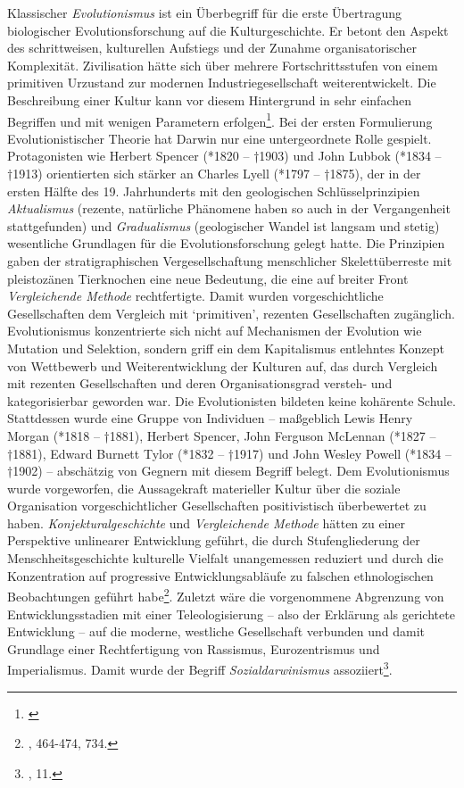 \documentclass[openany,twoside,twocolumn]{book}
\let\rmarkdownfootnote\footnote%
\def\footnote{\protect\rmarkdownfootnote}
\begin{document}
Klassischer \emph{Evolutionismus} ist ein Überbegriff für die erste
Übertragung biologischer Evolutionsforschung auf die Kulturgeschichte.
Er betont den Aspekt des schrittweisen, kulturellen Aufstiegs und der
Zunahme organisatorischer Komplexität. Zivilisation hätte sich über
mehrere Fortschrittsstufen von einem primitiven Urzustand zur modernen
Industriegesellschaft weiterentwickelt. Die Beschreibung einer Kultur
kann vor diesem Hintergrund in sehr einfachen Begriffen und mit wenigen
Parametern erfolgen\footnote{\textcite{noauthor_evolutionismus_1986}}.
Bei der ersten Formulierung Evolutionistischer Theorie hat Darwin nur
eine untergeordnete Rolle gespielt. Protagonisten wie Herbert Spencer
(*1820 -- †1903) und John Lubbok (*1834 -- †1913) orientierten sich
stärker an Charles Lyell (*1797 -- †1875), der in der ersten Hälfte des
19. Jahrhunderts mit den geologischen Schlüsselprinzipien
\emph{Aktualismus} (rezente, natürliche Phänomene haben so auch in der
Vergangenheit stattgefunden) und \emph{Gradualismus} (geologischer
Wandel ist langsam und stetig) wesentliche Grundlagen für die
Evolutionsforschung gelegt hatte. Die Prinzipien gaben der
stratigraphischen Vergesellschaftung menschlicher Skelettüberreste mit
pleistozänen Tierknochen eine neue Bedeutung, die eine auf breiter Front
\emph{Vergleichende Methode} rechtfertigte. Damit wurden
vorgeschichtliche Gesellschaften dem Vergleich mit `primitiven',
rezenten Gesellschaften zugänglich. Evolutionismus konzentrierte sich
nicht auf Mechanismen der Evolution wie Mutation und Selektion, sondern
griff ein dem Kapitalismus entlehntes Konzept von Wettbewerb und
Weiterentwicklung der Kulturen auf, das durch Vergleich mit rezenten
Gesellschaften und deren Organisationsgrad versteh- und kategorisierbar
geworden war. Die Evolutionisten bildeten keine kohärente Schule.
Stattdessen wurde eine Gruppe von Individuen -- maßgeblich Lewis Henry
Morgan (*1818 -- †1881), Herbert Spencer, John Ferguson McLennan (*1827
-- †1881), Edward Burnett Tylor (*1832 -- †1917) und John Wesley Powell
(*1834 -- †1902) -- abschätzig von Gegnern mit diesem Begriff belegt.
Dem Evolutionismus wurde vorgeworfen, die Aussagekraft materieller
Kultur über die soziale Organisation vorgeschichtlicher Gesellschaften
positivistisch überbewertet zu haben. \emph{Konjekturalgeschichte} und
\emph{Vergleichende Methode} hätten zu einer Perspektive unlinearer
Entwicklung geführt, die durch Stufengliederung der
Menschheitsgeschichte kulturelle Vielfalt unangemessen reduziert und
durch die Konzentration auf progressive Entwicklungsabläufe zu falschen
ethnologischen Beobachtungen geführt habe\footnote{\textcite{petermann_geschichte_2004},
  464-474, 734.}. Zuletzt wäre die vorgenommene Abgrenzung von
Entwicklungsstadien mit einer Teleologisierung -- also der Erklärung als
gerichtete Entwicklung -- auf die moderne, westliche Gesellschaft
verbunden und damit Grundlage einer Rechtfertigung von Rassismus,
Eurozentrismus und Imperialismus. Damit wurde der Begriff
\emph{Sozialdarwinismus} assoziiert\footnote{\textcite{ShennanGenesmemeshuman2002},
  11.}.
\end{document}

